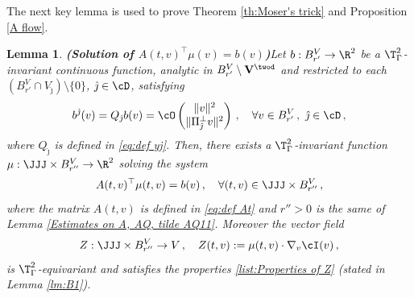 \documentclass[11pt,a4paper,reqno]{article}
\numberwithin{equation}{section}
\newtheorem{lemma}[theorem]{Lemma}
\theoremstyle{definition}
\begin{document}
    The next key lemma  is used to prove Theorem \ref{th:Moser's trick} and Proposition \ref{A flow}.
    \begin{lemma}{\bf (Solution of  $A(t,v)^\top \mu(v)=b(v)$)}\label{lm:linear equation}
        Let  $b:B_{r'}^V\to \R^2$ be a $\T^2_\Gamma$-invariant continuous function, analytic in $B_{r'}^V\setminus {\bf V}^{\twod}$ and restricted to each $(B_{r'}^V\cap V_{\hat \jmath})\setminus\{0\}$, ${\hat \jmath} \in \cD $, satisfying 
        \begin{equation}\label{estbj}
            b^{\hat \jmath} (v)=Q_{\hat \jmath} b(v)=\cO\begin{pmatrix}
                \|v\|^2\\
                \|\Pi_{\hat \jmath}^\bot v\|^2
            \end{pmatrix} \, , \quad 
                   \forall  v\in B_{r'}^V \, , \ {\hat \jmath} \in \cD \, , 
        \end{equation}
        where $Q_{\hat \jmath}$ is defined in \eqref{eq:def yj}.
        Then, 
        there exists a $\T^2_\Gamma$-invariant function $\mu: \JJJ \times B_{r''}^V \to \R^2$ solving the system 
        \begin{equation}\label{eq:linear system}
            A(t,v)^\top\mu(t,v)=b(v) \, , 
            \quad \forall (t,v)\in \JJJ\times B_{r''}^V \, , 
        \end{equation}
        where the matrix $ A(t,v) $ is defined in \eqref{eq:def At} and $r''>0$ is the same of Lemma \ref{Estimates on A, AQ, tilde AQ11}.
        Moreover
        the vector field 
        \begin{equation}\label{defZ}
        Z:\JJJ \times B_{r''}^V\to V \, , \quad       Z(t,v):=\mu(t,v)\cdot \nabla_v  \cI(v) \, , 
        \end{equation}
        is $\T^2_\Gamma$-equivariant and satisfies the properties \eqref{list:Properties of Z} (stated in  Lemma \ref{lm:B1}).
    \end{lemma}
    
\end{document}
